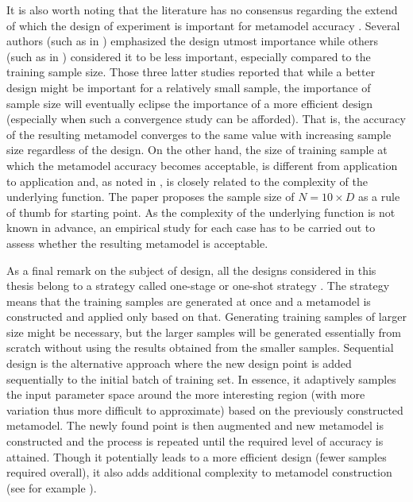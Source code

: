 It is also worth noting that the literature has no consensus regarding the extend of which the design of experiment is important for metamodel accuracy \cite{Viana2016}.
Several authors (such as in \cite{Koehler1996,Jin2003,Damblin2013}) emphasized the design utmost importance while others (such as in \cite{Simpson2001a,Liu2005,Chen2016}) considered it to be less important, especially compared to the training sample size. 
Those three latter studies reported that while a better design might be important for a relatively small sample, the importance of sample size will eventually eclipse the importance of a more efficient design (especially when such a convergence study can be afforded).
That is, the accuracy of the resulting metamodel converges to the same value with increasing sample size regardless of the design.
On the other hand, the size of training sample at which the metamodel accuracy becomes acceptable, is different from application to application and, as noted in \cite{Loeppky2009}, is closely related to the complexity of the underlying function.
The paper proposes the sample size of $N = 10\times D$ as a rule of thumb for starting point.
As the complexity of the underlying function is not known in advance, an empirical study for each case has to be carried out to assess whether the resulting metamodel is acceptable.    

As a final remark on the subject of design, all the designs considered in this thesis belong to a strategy called one-stage or one-shot strategy \cite{Kleijnen2007,Crombecq2011}.
The strategy means that the training samples are generated at once and a metamodel is constructed and applied only based on that.
Generating training samples of larger size might be necessary, but the larger samples will be generated essentially from scratch without using the results obtained from the smaller samples. 
Sequential design is the alternative approach where the new design point is added sequentially to the initial batch of training set.
In essence, it adaptively samples the input parameter space around the more interesting region (with more variation thus more difficult to approximate) based on the previously constructed metamodel.
The newly found point is then augmented and new metamodel is constructed and the process is repeated until the required level of accuracy is attained.
Though it potentially leads to a more efficient design (fewer samples required overall), it also adds additional complexity to metamodel construction (see for example \cite{Xiong2009,Crombecq2011}). 

